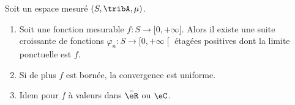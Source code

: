 \begin{theorem}\label{THOooXHIVooKUddLi}
    Soit un espace mesuré \( (S,\tribA,\mu)\).
    \begin{enumerate}
        \item
    Soit une fonction mesurable \( f\colon S\to \mathopen[ 0 , +\infty \mathclose]\). Alors il existe une suite croissante de fonctions \( \varphi_n\colon S\to \mathopen[ 0 , +\infty \mathclose[\) étagées positives dont la limite ponctuelle est \( f\).
    \item
        Si de plus \( f\) est bornée, la convergence est uniforme.
    \item
        Idem pour \( f\) à valeurs dans \( \bar \eR\) ou \( \eC\).
    \end{enumerate}
\end{theorem}

